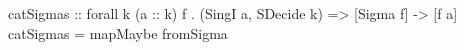 \begin{code}
catSigmas
    :: forall k (a :: k) f
     . (SingI a, SDecide k)
    => [Sigma f]
    -> [f a]
catSigmas = mapMaybe fromSigma
\end{code}
